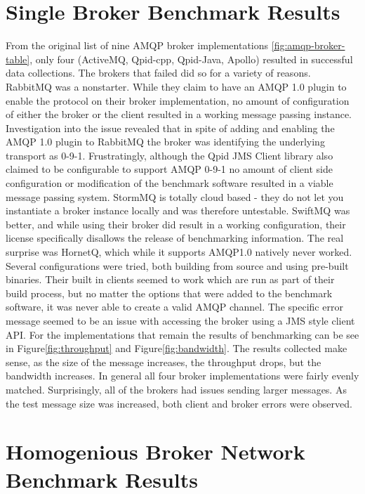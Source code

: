 \documentclass{thesis}
\begin{document}
\section{Single Broker Benchmark Results}
From the original list of nine AMQP broker implementations \ref{fig:amqp-broker-table}, only four (ActiveMQ, Qpid-cpp, Qpid-Java, Apollo) resulted in successful data collections.  The brokers that failed did so for a variety of reasons.  RabbitMQ was a nonstarter.  While they claim to have an AMQP 1.0 plugin to enable the protocol on their broker implementation, no amount of configuration of either the broker or the client resulted in a working message passing instance.  Investigation into the issue revealed that in spite of adding and enabling the AMQP 1.0 plugin to RabbitMQ the broker was identifying the underlying transport as 0-9-1.  Frustratingly, although the Qpid JMS Client library also claimed to be configurable to support AMQP 0-9-1 no amount of client side configuration or modification of the benchmark software resulted in a viable message passing system.  StormMQ is totally cloud based - they do not let you instantiate a broker instance locally and was therefore untestable.  SwiftMQ was better, and while using their broker did result in a working configuration, their license specifically disallows the release of benchmarking information.  The real surprise was HornetQ, which while it supports AMQP1.0 natively never worked.  Several configurations were tried, both building from source and using pre-built binaries.  Their built in clients seemed to work which are run as part of their build process, but no matter the options that were added to the benchmark software, it was never able to create a valid AMQP channel.  The specific error message seemed to be an issue with accessing the broker using a JMS style client API.  For the implementations that remain the results of benchmarking can be see in Figure\ref{fig:throughput} and Figure\ref{fig:bandwidth}.  The results collected make sense, as the size of the message increases, the throughput drops, but the bandwidth increases.  In general all four broker implementations were fairly evenly matched.  Surprisingly, all of the brokers had issues sending larger messages.  As the test message size was increased, both client and broker errors were observed. 

\section{Homogenious Broker Network Benchmark Results}
\end{document}
